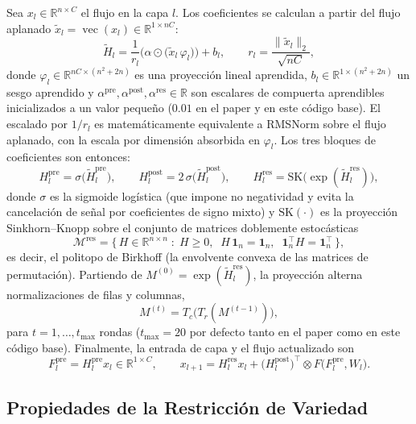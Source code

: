 Sea $x_l \in \mathbb{R}^{n \times C}$ el flujo en la capa $l$. Los coeficientes
se calculan a partir del flujo aplanado
$\tilde{x}_l = \operatorname{vec}(x_l) \in \mathbb{R}^{1 \times nC}$:
\[
\tilde{H}_l = \frac{1}{r_l}\Big(\alpha \odot
\big(\tilde{x}_l\, \varphi_l\big)\Big) + b_l,
\qquad r_l = \frac{\|\tilde{x}_l\|_2}{\sqrt{nC}},
\]
donde $\varphi_l \in \mathbb{R}^{nC \times (n^2+2n)}$ es una proyección lineal
aprendida, $b_l \in \mathbb{R}^{1 \times (n^2+2n)}$ un sesgo aprendido y
$\alpha^{\text{pre}}, \alpha^{\text{post}}, \alpha^{\text{res}} \in \mathbb{R}$
son escalares de compuerta aprendibles inicializados a un valor pequeño ($0.01$
en el paper y en este código base). El escalado por $1/r_l$ es matemáticamente
equivalente a RMSNorm sobre el flujo aplanado, con la escala por dimensión
absorbida en $\varphi_l$. Los tres bloques de coeficientes son entonces:
\[
H^{\text{pre}}_l = \sigma\big(\tilde{H}^{\text{pre}}_l\big),
\qquad
H^{\text{post}}_l = 2\,\sigma\big(\tilde{H}^{\text{post}}_l\big),
\qquad
H^{\text{res}}_l = \mathrm{SK}\big(\exp(\tilde{H}^{\text{res}}_l)\big),
\]
donde $\sigma$ es la sigmoide logística (que impone no negatividad y evita la
cancelación de señal por coeficientes de signo mixto) y
$\mathrm{SK}(\cdot)$ es la proyección Sinkhorn--Knopp sobre el conjunto de
matrices doblemente estocásticas
\[
\mathcal{M}^{\text{res}} = \big\{\, H \in \mathbb{R}^{n \times n} \;:\;
H \ge 0,\;\; H\,\mathbf{1}_n = \mathbf{1}_n,\;\;
\mathbf{1}_n^{\top} H = \mathbf{1}_n^{\top} \,\big\},
\]
es decir, el politopo de Birkhoff (la envolvente convexa de las matrices de
permutación). Partiendo de $M^{(0)} = \exp(\tilde{H}^{\text{res}}_l)$, la
proyección alterna normalizaciones de filas y columnas,
\[
M^{(t)} = T_c\big(T_r(M^{(t-1)})\big),
\]
para $t = 1, \ldots, t_{\max}$ rondas ($t_{\max} = 20$ por defecto tanto en el
paper como en este código base). Finalmente, la entrada de capa y el flujo
actualizado son
\[
F^{\text{pre}}_l = H^{\text{pre}}_l x_l \in \mathbb{R}^{1 \times C},
\qquad
x_{l+1} = H^{\text{res}}_l x_l +
\big(H^{\text{post}}_l\big)^{\!\top} \otimes F\big(F^{\text{pre}}_l, W_l\big).
\]

\subsection{Propiedades de la Restricción de Variedad}

